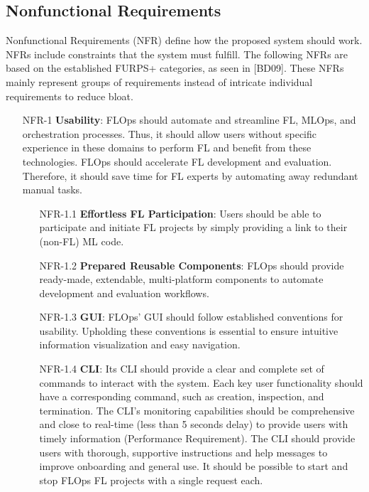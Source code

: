 \subsection{Nonfunctional Requirements}
Nonfunctional Requirements (NFR) define how the proposed system should work.
NFRs include constraints that the system must fulfill.
The following NFRs are based on the established FURPS+ categories, as seen in [BD09].
These NFRs mainly represent groups of requirements instead of intricate individual requirements to reduce bloat.

\begin{itemize}
    \item [NFR-1] {\textbf{Usability}}:
        FLOps should automate and streamline FL, MLOps, and orchestration processes.
        Thus, it should allow users without specific experience in these domains to perform FL and benefit from these technologies.
        FLOps should accelerate FL development and evaluation.
        Therefore, it should save time for FL experts by automating away redundant manual tasks.
        \begin{itemize}
            \item [NFR-1.1] \textbf{Effortless FL Participation}:
                Users should be able to participate and initiate FL projects by simply providing a link to their (non-FL) ML code.
            \item [NFR-1.2] \textbf{Prepared Reusable Components}:
                FLOps should provide ready-made, extendable, multi-platform components to automate development and evaluation workflows.
            \item [NFR-1.3] \textbf{GUI}:
                FLOps' GUI should follow established conventions for usability.
                Upholding these conventions is essential to ensure intuitive information visualization and easy navigation.
            \item [NFR-1.4] \textbf{CLI}:
                Its CLI should provide a clear and complete set of commands to interact with the system.
                Each key user functionality should have a corresponding command, such as creation, inspection, and termination.
                The CLI's monitoring capabilities should be comprehensive and close to real-time (less than 5 seconds delay) to provide users with timely information (Performance Requirement).
                The CLI should provide users with thorough, supportive instructions and help messages to improve onboarding and general use.
                It should be possible to start and stop FLOps FL projects with a single request each.

\end{itemize}
\end{itemize}
